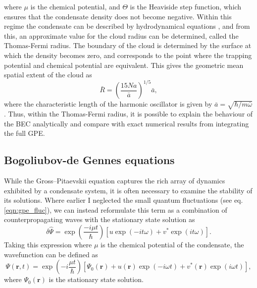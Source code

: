 where $\mu$ is the chemical potential, and $\Theta$ is the Heaviside step function, which ensures that the condensate density does not become negative. Within this regime the condensate can be described by hydrodynamical equations \cite[Pg.~180]{BK:Pitaevskii_Stringari_2003}, and from this, an approximate value for the cloud radius can be determined, called the Thomas-Fermi radius. The boundary of the cloud is determined by the surface at which the density becomes zero, and corresponds to the point where the trapping potential and chemical potential are equivalent. This gives the geometric mean spatial extent of the cloud \cite[~p. 169]{BK:Pethick_Smith_2008} as
\begin{equation}
\bar{R} = \left(\frac{15Na}{\bar{a}}\right)^{1/5}\bar{a},
\end{equation}
where the characteristic length of the harmonic oscillator is given by
$\bar{a} = \sqrt{{\hbar}/{m\bar{\omega}}}$. Thus, within the Thomas-Fermi radius, it is possible to explain the behaviour of the BEC analytically and compare with exact numerical results from integrating the full GPE.

\subsection{Bogoliubov-de Gennes equations}
\label{sec:bogo}
While the Gross--Pitaevskii equation captures the rich array of dynamics exhibited by a condensate system, it is often necessary to examine the stability of its solutions. Where earlier I neglected the small quantum fluctuations (see eq. \ref{eqn:gpe_fluc}), we can instead reformulate this term as a combination of counterpropagating waves with the stationary state solution as
\begin{equation}
    \delta\hat{\Psi} = \exp\left(\frac{-i\mu t}{\hbar}\right)[u\exp(-it\omega) + v^{*}\exp(it\omega)].
\end{equation}
Taking this expression where $\mu$ is the chemical potential of the condensate, the wavefunction can be defined as
\begin{equation}\label{eqn:bogo_psi}
\Psi(\mathbf{r},t) = \exp\left(-i\frac{\mu t}{\hbar}\right)[\Psi_0(\mathbf{r}) + u(\mathbf{r})\exp\left(-i\omega t\right) + v^{*}(\mathbf{r})\exp\left(i\omega t\right) ],
\end{equation}
where $\Psi_0(\mathbf{r})$ is the stationary state solution.

